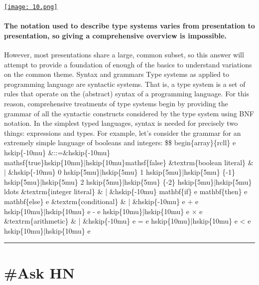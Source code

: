 \documentclass[10pt,a4paper]{article}
\begin{document}
\begin{minipage}[t]{0.80\linewidth}
\vspace{0pt}
\begin{multicols}{2}

    \href{https://langdev.stackexchange.com/questions/2692/how-should-i-read-type-system-notation?utm\_source=hackernewsletter\&utm\_medium=email\&utm\_term=fav}{
        \texttt{[image: 10.png]}
    }
  
\paragraph{The notation used to describe type systems varies from presentation to presentation, so giving a comprehensive overview is impossible.}
 However, most presentations share a large, common subset, so this answer will attempt to provide a foundation of enough of the basics to understand variations on the common theme.
Syntax and grammars
Type systems as applied to programming language are syntactic systems. That is, a type system is a set of rules that operate on the (abstract) syntax of a programming language. For this reason, comprehensive treatments of type systems begin by providing the grammar of all the syntactic constructs considered by the type system using BNF notation. In the simplest typed languages, syntax is needed for precisely two things: expressions and types.
For example, let’s consider the grammar for an extremely simple language of booleans and integers:
\$\$
begin\{array\}\{rcll\}
e hskip\{-10mu\}
\&::=\&hskip\{-10mu\} mathsf\{true\}hskip\{10mu\}|hskip\{10mu\}mathsf\{false\} \&textrm\{boolean literal\}
\& | \&hskip\{-10mu\} 0 hskip\{5mu\}|hskip\{5mu\} 1 hskip\{5mu\}|hskip\{5mu\} \{-1\} hskip\{5mu\}|hskip\{5mu\} 2 hskip\{5mu\}|hskip\{5mu\} \{-2\} hskip\{5mu\}|hskip\{5mu\} ldots \&textrm\{integer literal\}
\& | \&hskip\{-10mu\} mathbf\{if\} e mathbf\{then\} e mathbf\{else\} e \&textrm\{conditional\}
\& | \&hskip\{-10mu\} e + e hskip\{10mu\}|hskip\{10mu\} e - e hskip\{10mu\}|hskip\{10mu\} e × e \&textrm\{arithmetic\}
\& | \&hskip\{-10mu\} e = e hskip\{10mu\}|hskip\{10mu\} e < e hskip\{10mu\}|hskip\{10mu\} e

\end{multicols}
\end{minipage}
\par\medskip
\noindent\textcolor{red}{\rule{\linewidth}{0.2mm}}

\newpage
\section{\#Ask HN}
\end{document}
